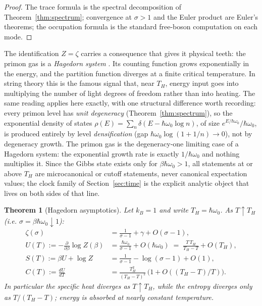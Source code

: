 \documentclass[11pt,a4paper]{article}
\theoremstyle{plain}
\newtheorem{theorem}{Theorem}[section]
\theoremstyle{definition}
\theoremstyle{remark}
\begin{document}
\begin{proof}
The trace formula is the spectral decomposition of Theorem~\ref{thm:spectrum}; convergence at
$\sigma>1$ and the Euler product are Euler's theorems; the occupation formula is the standard
free-boson computation on each mode.
\end{proof}

The identification $Z=\zeta$ carries a consequence that gives it physical teeth: the primon gas
is a \emph{Hagedorn system} \cite{hagedorn1965}. Its counting function grows exponentially
in the energy, and the partition function diverges at a finite critical temperature. In
string theory this is the famous signal that, near $T_{H}$, energy input goes into multiplying
the number of light degrees of freedom rather than into heating. The same reading applies here
exactly, with one structural difference worth recording: every primon level has \emph{unit
degeneracy} (Theorem~\ref{thm:spectrum}), so the exponential density of states
$\rho(E)=\sum_{n}\delta(E-\hbar\omega_{0}\log n)$, of size $e^{E/\hbar\omega_{0}}/\hbar\omega_{0}$,
is produced entirely by level \emph{densification} (gap $\hbar\omega_{0}\log(1+1/n)\to0$), not
by degeneracy growth. The primon gas is the degeneracy-one limiting case of a Hagedorn system:
the exponential growth rate is exactly $1/\hbar\omega_{0}$ and nothing multiplies it. Since
the Gibbs state exists only for $\beta\hbar\omega_{0}>1$, all statements at or above $T_{H}$ are
microcanonical or cutoff statements, never canonical expectation values; the clock family of
Section~\ref{sec:time} is the explicit analytic object that lives on both sides of that line.

\begin{theorem}[Hagedorn asymptotics]\label{thm:hagedorn}
Let $k_{B}=1$ and write $T_{H}=\hbar\omega_{0}$. As $T\uparrow T_{H}$ (i.e.
$\sigma=\beta\hbar\omega_{0}\downarrow 1$):
\begin{align}
\zeta(\sigma)&=\frac{1}{\sigma-1}+\gamma+O(\sigma-1),\\
U(T):=-\frac{\partial}{\partial\beta}\log Z(\beta)
&=\frac{\hbar\omega_{0}}{\sigma-1}+O(\hbar\omega_{0})
\;=\;\frac{T\,T_{H}}{T_{H}-T}+O(T_{H}),\\
S(T):=\beta U+\log Z
&=\frac{1}{\sigma-1}-\log(\sigma-1)+O(1),\\
C(T):=\frac{dU}{dT}
&=\frac{T_{H}^{2}}{(T_{H}-T)^{2}}\,\bigl(1+O((T_{H}-T)/T)\bigr).
\end{align}
In particular the specific heat diverges as $T\uparrow T_{H}$, while the entropy diverges
only as $T/(T_{H}-T)$; energy is absorbed at nearly constant temperature.
\end{theorem}
\end{document}
